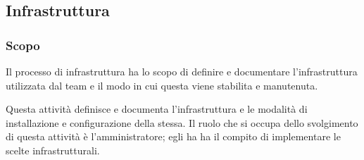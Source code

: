 \documentclass[10pt, a4paper]{article}
\begin{document}
\subsection{Infrastruttura}
\subsubsection{Scopo}
Il processo di infrastruttura ha lo scopo di definire e documentare l'infrastruttura utilizzata dal team e il modo in cui questa viene stabilita e manutenuta.

Questa attività definisce e documenta l'infrastruttura e le modalità di installazione e configurazione della stessa.
Il ruolo che si occupa dello svolgimento di questa attività è l'amministratore; egli ha ha il compito di implementare le scelte infrastrutturali.
\end{document}
